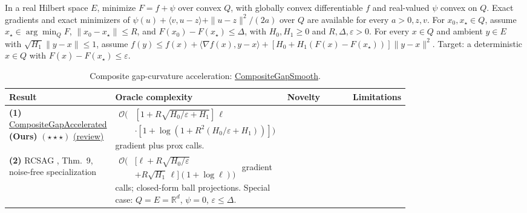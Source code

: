 \begin{table}[tp]
\centering
\caption{Composite gap-curvature acceleration: \href{https://github.com/k3nfalt/longtails/blob/main/LongTails/Setups/CompositeGapSmooth.lean}{CompositeGapSmooth}.}\label{tab:CompositeGapSmooth}
\parbox{\linewidth}{\footnotesize In a real Hilbert space $E$, minimize $F=f+\psi$ over convex $Q$, with globally convex differentiable $f$ and real-valued $\psi$ convex on $Q$. Exact gradients and exact minimizers of $\psi(u)+\langle v,u-z\rangle+\|u-z\|^2/(2a)$ over $Q$ are available for every $a>0,z,v$. For $x_0,x_\star\in Q$, assume $x_\star\in\arg\min_Q F$, $\|x_0-x_\star\|\le R$, and $F(x_0)-F(x_\star)\le\Delta$, with $H_0,H_1\ge0$ and $R,\Delta,\varepsilon>0$. For every $x\in Q$ and ambient $y\in E$ with $\sqrt{H_1}\|y-x\|\le1$, assume $f(y)\le f(x)+\langle\nabla f(x),y-x\rangle+[H_0+H_1(F(x)-F(x_\star))]\|y-x\|^2$. Target: a deterministic $\widehat x\in Q$ with $F(\widehat x)-F(x_\star)\le\varepsilon$.}\par\smallskip
\begin{threeparttable}
\footnotesize
\setlength{\tabcolsep}{4pt}\renewcommand{\arraystretch}{1.25}
\begin{tabularx}{\linewidth}{@{}>{\raggedright\arraybackslash}p{0.20\linewidth}>{\raggedright\arraybackslash}p{0.32\linewidth}>{\raggedright\arraybackslash}p{0.25\linewidth}>{\raggedright\arraybackslash}X@{}}
\toprule
\textbf{Result} & \textbf{Oracle complexity} & \textbf{Novelty} & \textbf{Limitations} \\
\midrule
\textbf{(1)} \href{https://github.com/k3nfalt/longtails/blob/main/LongTails/Theorems/CompositeGapAccelerated.lean}{Composite\allowbreak Gap\allowbreak Accelerated} \textbf{(Ours)} $(\star\star\star)$ \href{https://github.com/k3nfalt/longtails/blob/main/scripts/reviews/CompositeGapAccelerated.md}{(review)}
& $\begin{aligned}\mathcal{O}\bigl(&[1+R\sqrt{H_0/\varepsilon+H_1}]\,\ell\\ &\cdot[1+\log(1+R^2(H_0/\varepsilon+H_1))]\bigr)\end{aligned}$ gradient plus prox calls.
& & \\
\midrule[1.2pt]
\textbf{(2)} RCSAG \citep{gssgLobanov2026}, Thm.~9, noise-free specialization
& $\begin{aligned}\mathcal{O}\bigl(&[\ell+R\sqrt{H_0/\varepsilon}\\ &+R\sqrt{H_1}\,\ell](1+\log\ell)\bigr)\end{aligned}$ gradient calls; closed-form ball projections. Special case: $Q=E=\mathbb{R}^d$, $\psi=0$, $\varepsilon\le\Delta$.

\end{tabularx}
\end{threeparttable}
\end{table}
